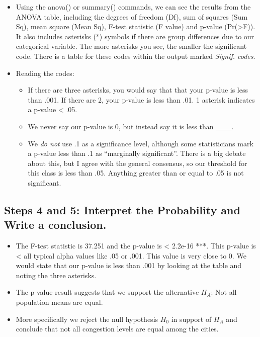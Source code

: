 \documentclass[
  letterpaper,
  DIV=11,
  numbers=noendperiod]{scrreprt}
\providecommand{\tightlist}{%
  \setlength{\itemsep}{0pt}\setlength{\parskip}{0pt}}\usepackage{longtable,booktabs,array}
\begin{document}
\begin{itemize}
\tightlist
\item
  Using the anova() or summary() commands, we can see the results from
  the ANOVA table, including the degrees of freedom (Df), sum of squares
  (Sum Sq), mean square (Mean Sq), F-test statistic (F value) and
  p-value (Pr(\textgreater F)). It also includes asterisks (*) symbols
  if there are group differences due to our categorical variable. The
  more asterisks you see, the smaller the significant code. There is a
  table for these codes within the output marked \emph{Signif. codes}.
\item
  Reading the codes:

  \begin{itemize}
  \tightlist
  \item
    If there are three asterisks, you would say that that your p-value
    is less than .001. If there are 2, your p-value is less than .01. 1
    asterisk indicates a p-value \textless{} .05.
  \item
    We never say our p-value is 0, but instead say it is less than
    \_\_\_.
  \item
    We \emph{do not} use .1 as a significance level, although some
    statisticians mark a p-value less than .1 as ``marginally
    significant''. There is a big debate about this, but I agree with
    the general consensus, so our threshold for this class is less than
    .05. Anything greater than or equal to .05 is not significant.
  \end{itemize}
\end{itemize}

\subsection{Steps 4 and 5: Interpret the Probability and Write a
conclusion.}\label{steps-4-and-5-interpret-the-probability-and-write-a-conclusion.}

\begin{itemize}
\tightlist
\item
  The F-test statistic is 37.251 and the p-value is \textless{} 2.2e-16
  ***. This p-value is \textless{} all typical alpha values like .05 or
  .001. This value is very close to 0. We would state that our p-value
  is less than .001 by looking at the table and noting the three
  asterisks.\\
\item
  The p-value result suggests that we support the alternative \(H_A\):
  Not all population means are equal.
\item
  More specifically we reject the null hypothesis \(H_0\) in support of
  \(H_A\) and conclude that not all congestion levels are equal among
  the cities.
\end{itemize}
\end{document}
